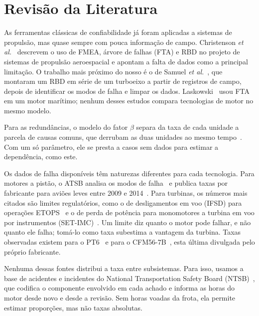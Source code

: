 \section{Revisão da Literatura}\label{sec:revisao}

As ferramentas clássicas de confiabilidade já foram aplicadas a sistemas de propulsão, mas quase sempre com pouca informação de campo.
Christenson \emph{et al.}~\cite{christenson2000} descrevem o uso de FMEA, árvore de falhas (FTA) e RBD no projeto de sistemas de propulsão aeroespacial e apontam a falta de dados como a principal limitação.
O trabalho mais próximo do nosso é o de Samuel \emph{et al.}~\cite{samuel2006}, que montaram um RBD em série de um turboeixo a partir de registros de campo, depois de identificar os modos de falha e limpar os dados.
Laskowski~\cite{laskowski2015} usou FTA em um motor marítimo; nenhum desses estudos compara tecnologias de motor no mesmo modelo.

Para as redundâncias, o modelo do fator $\beta$ separa da taxa de cada unidade a parcela de causas comuns, que derrubam as duas unidades ao mesmo tempo~\cite{ebeling1997,rausand2004}.
Com um só parâmetro, ele se presta a casos sem dados para estimar a dependência, como este.

Os dados de falha disponíveis têm naturezas diferentes para cada tecnologia.
Para motores a pistão, o ATSB analisa os modos de falha~\cite{romeyn2007} e publica taxas por fabricante para aviões leves entre 2009 e 2014~\cite{atsb2016}.
Para turbinas, os números mais citados são limites regulatórios, como o de desligamentos em voo (IFSD) para operações ETOPS~\cite{cfr25k} e o de perda de potência para monomotores a turbina em voo por instrumentos (SET-IMC)~\cite{easa2017}.
Um limite diz quanto o motor pode falhar, e não quanto ele falha; tomá-lo como taxa subestima a vantagem da turbina.
Taxas observadas existem para o PT6~\cite{stobie2019} e para o CFM56-7B~\cite{cfm2012}, esta última divulgada pelo próprio fabricante.

Nenhuma dessas fontes distribui a taxa entre subsistemas.
Para isso, usamos a base de acidentes e incidentes do National Transportation Safety Board (NTSB)~\cite{ntsb}, que codifica o componente envolvido em cada achado e informa as horas do motor desde novo e desde a revisão.
Sem horas voadas da frota, ela permite estimar proporções, mas não taxas absolutas.
